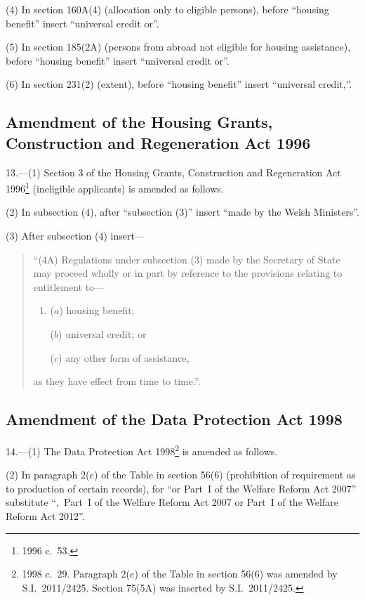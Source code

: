 \documentclass[12pt,a4paper]{article}
\begin{document}
(4) In section 160A(4) (allocation only to eligible persons), before “housing benefit” insert “universal credit or”.

(5) In section 185(2A) (persons from abroad not eligible for housing assistance), before “housing benefit” insert “universal credit or”.

(6) In section 231(2) (extent), before “housing benefit” insert “universal credit,”.

\subsection[13. Amendment of the Housing Grants, Construction and Regeneration Act 1996]{Amendment of the Housing Grants, Construction and Regeneration Act 1996}

13.—(1) Section 3 of the Housing Grants, Construction and Regeneration Act 1996\footnote{1996 c.~53.} (ineligible applicants) is amended as follows.

(2) In subsection (4), after “subsection (3)” insert “made by the Welsh Ministers”.

(3) After subsection (4) insert—
\begin{quotation}
“(4A) Regulations under subsection (3) made by the Secretary of State may proceed wholly or in part by reference to the provisions relating to entitlement to—
\begin{enumerate}\item[]
($a$) housing benefit;

($b$) universal credit; or

($c$) any other form of assistance,
\end{enumerate}
as they have effect from time to time.”.
\end{quotation}

\subsection[14. Amendment of the Data Protection Act 1998]{Amendment of the Data Protection Act 1998}

14.—(1) The Data Protection Act 1998\footnote{1998 c.~29. Paragraph 2($e$) of the Table in section 56(6) was amended by S.I.~2011/2425. Section 75(5A) was inserted by S.I.~2011/2425.} is amended as follows.

(2) In paragraph 2($e$)  of the Table in section 56(6) (prohibition of requirement as to production of certain records), for “or Part~I of the Welfare Reform Act 2007” substitute “,~Part~I of the Welfare Reform Act 2007 or Part~I of the Welfare Reform Act 2012”.
\end{document}
